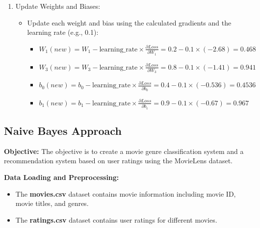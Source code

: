 \documentclass[a4paper]{article}
\theoremstyle{plain}
\theoremstyle{definition}
\begin{document}
\begin{enumerate}
\begin{itemize}
\begin{itemize}
    \end{itemize}
  \end{itemize}
  \item Update Weights and Biases:
  \begin{itemize}
    \item Update each weight and bias using the calculated gradients and the learning rate (e.g., 0.1):
    \begin{itemize}
      \item \( W_1(new) = W_1 - \text{learning\_rate} \times \frac{\partial Loss}{\partial W_1} = 0.2 - 0.1 \times (-2.68) = 0.468 \)
      \item \( W_3(new) = W_3 - \text{learning\_rate} \times \frac{\partial Loss}{\partial W_3} = 0.8 - 0.1 \times (-1.41) = 0.941 \)
      \item \( b_0(new) = b_0 - \text{learning\_rate} \times \frac{\partial Loss}{\partial b_0} = 0.4 - 0.1 \times (-0.536) = 0.4536 \)
      \item \( b_1(new) = b_1 - \text{learning\_rate} \times \frac{\partial Loss}{\partial b_1} = 0.9 - 0.1 \times (-0.67) = 0.967 \)
    \end{itemize}
  \end{itemize}
\end{enumerate}





    \subsection{Naive Bayes Approach}
    
        \textbf{Objective:}
        The objective is to create a movie genre classification system and a recommendation system based on user ratings using the MovieLens dataset.
        
        \textbf{Data Loading and Preprocessing:}
        \begin{itemize}
            \item The \textbf{movies.csv} dataset contains movie information including movie ID, movie titles, and genres.
            \item The \textbf{ratings.csv} dataset contains user ratings for different movies.
        \end{itemize}
        
\end{document}
